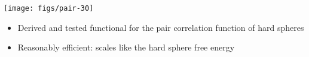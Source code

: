 \begin{frame}
  \frametitle{\conclude}
  \begin{center}
    \texttt{[image: figs/pair-30]}
  \end{center}
  \begin{itemize}
  \item Derived and tested functional for the pair correlation
    function of hard spheres
  \item Reasonably efficient: scales like the hard sphere free energy
  \end{itemize}
\end{frame}

